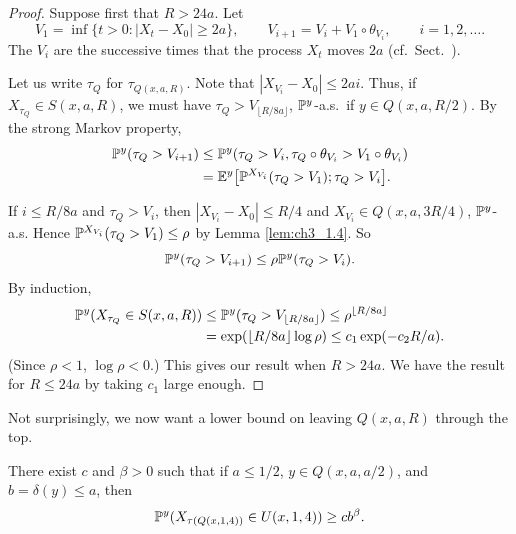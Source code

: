 \begin{proof}
Suppose first that $R > 24a$. Let
\[
    V_1 = \inf\{t > 0 : |X_t-X_0| \geq 2a\}, \qquad V_{i+1} = V_i + V_1 \circ \theta_{V_i}, \qquad i = 1,2,\ldots.
\]
The $V_i$ are the successive times that the process $X_t$ moves $2a$ (cf.\ Sect.\ ).

Let us write $\tau_Q$ for $\tau_{Q(x,a,R)}$. Note that $|X_{V_i} - X_0| \leq 2ai$. Thus, if $X_{\tau_Q} \in S(x,a,R)$, we must have $\tau_Q > V_{\lfloor R/8a \rfloor}$, $\P^y$-a.s.\ if $y \in Q(x,a,R/2)$. By the strong Markov property,
\begin{align*}
    \P^y(\tau_Q > V_{i+1}) &\leq \P^y(\tau_Q > V_i, \tau_Q \circ \theta_{V_i} > V_1 \circ \theta_{V_i}) \\
    &= \E^y\big[\P^{X_{V_i}}(\tau_Q > V_1); \tau_Q > V_i\big].
\end{align*}

If $i \leq R/8a$ and $\tau_Q > V_i$, then $|X_{V_i} - X_0| \leq R/4$ and $X_{V_i} \in Q(x,a,3R/4)$, $\P^y$-a.s. Hence $\P^{X_{V_i}}(\tau_Q > V_1) \leq \rho$ by Lemma \ref{lem:ch3_1.4}. So
\[
    \P^y(\tau_Q > V_{i+1}) \leq \rho\P^y(\tau_Q > V_i).
\]
By induction,
\begin{align*}
    \P^y(X_{\tau_Q} \in S(x,a,R)) &\leq \P^y(\tau_Q > V_{\lfloor R/8a \rfloor}) \leq \rho^{\lfloor R/8a \rfloor} \\
    &= \exp(\lfloor R/8a \rfloor \log \rho) \leq c_1\exp(-c_2R/a).
\end{align*}
(Since $\rho < 1$, $\log \rho < 0$.) This gives our result when $R > 24a$. We have the result for $R \leq 24a$ by taking $c_1$ large enough.
\end{proof}

Not surprisingly, we now want a lower bound on leaving $Q(x,a,R)$ through the top.

\begin{lemma}\label{lem:ch3_1.6}
There exist $c$ and $\beta > 0$ such that if $a \leq 1/2$, $y \in Q(x,a,a/2)$, and $b = \delta(y) \leq a$, then
\[
    \P^y(X_{\tau(Q(x,1,4))} \in U(x,1,4)) \geq cb^\beta.
\]
\end{lemma}


